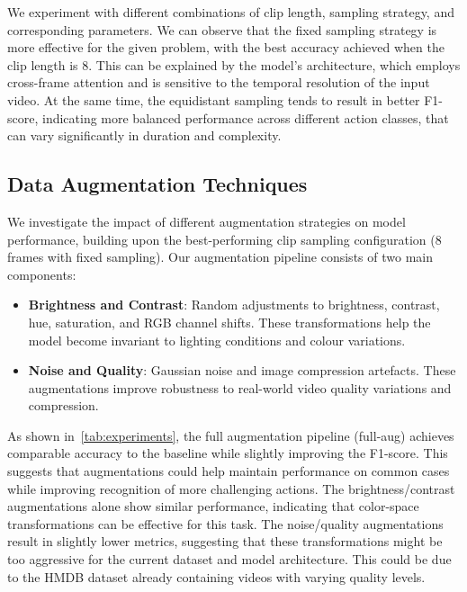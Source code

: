 We experiment with different combinations of clip length, sampling strategy, and corresponding parameters.
We can observe that the fixed sampling strategy is more effective for the given problem, with the best accuracy achieved when the clip length is $8$.
This can be explained by the model's architecture, which employs cross-frame attention and is sensitive to the temporal resolution of the input video.
At the same time, the equidistant sampling tends to result in better F1-score, indicating more balanced performance across different action classes, that can vary significantly in duration and complexity.

\subsection{Data Augmentation Techniques}

We investigate the impact of different augmentation strategies on model performance, building upon the best-performing clip sampling configuration (8 frames with fixed sampling).
Our augmentation pipeline consists of two main components:

\begin{itemize}
    \item \textbf{Brightness and Contrast}: Random adjustments to brightness, contrast, hue, saturation, and RGB channel shifts. 
    These transformations help the model become invariant to lighting conditions and colour variations.
    
    \item \textbf{Noise and Quality}: Gaussian noise and image compression artefacts. These augmentations improve robustness to real-world video quality variations and compression.
\end{itemize}

As shown in~\autoref{tab:experiments}, the full augmentation pipeline (full-aug) achieves comparable accuracy to the baseline while slightly improving the F1-score.
This suggests that augmentations could help maintain performance on common cases while improving recognition of more challenging actions. 
The brightness/contrast augmentations alone show similar performance, indicating that color-space transformations can be effective for this task.
The noise/quality augmentations result in slightly lower metrics, suggesting that these transformations might be too aggressive for the current dataset and model architecture. 
This could be due to the HMDB dataset already containing videos with varying quality levels.

